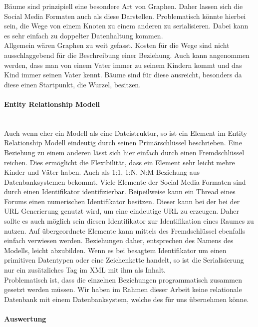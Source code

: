 \documentclass[a4paper]{article}
\begin{document}
	Bäume sind prinzipiell eine besondere Art von Graphen. Daher lassen sich
	die Social Media Formaten auch als diese Darstellen. Problematisch
	könnte hierbei sein, die Wege von einem Knoten zu einem anderen zu
	serialisieren. Dabei kann es sehr einfach zu doppelter Datenhaltung kommen. \\
	
	Allgemein wären Graphen zu weit gefasst. Kosten für die Wege sind nicht
	ausschlaggebend für die Beschreibung einer Beziehung. Auch kann angenommen
	werden, dass man von einem Vater immer zu seinem Kindern kommt und das Kind
	immer seinen Vater kennt. Bäume sind für diese ausreicht, besonders da diese
	einen Startpunkt, die Wurzel, besitzen.
	
	\paragraph{Entity Relationship Modell}\mbox{} \\
	
	Auch wenn eher ein Modell als eine Dateistruktur, so ist ein Element im
	Entity Relationship Modell eindeutig durch seinen Primärschlüssel beschrieben.
	Eine Beziehung zu einem anderen lässt sich hier einfach durch einen
	Fremdschlüssel reichen. Dies ermöglicht die Flexibilität, dass ein Element
	sehr leicht mehre Kinder und Väter haben. Auch als 1:1, 1:N. N:M Beziehung
	aus Datenbanksystemen bekommt. Viele Elemente der Social Media Formaten sind
	durch einen Identifikator identifizierbar. Beipeilweise kann ein Thread eines
	Forums einen numerischen Identifikator besitzen. Dieser kann bei der bei der
	URL Generierung	genutzt wird, um eine eindeutige URL zu erzeugen. Daher sollte
	es auch möglich sein diesen Identifikator zur Identifikation eines Raumes zu
	nutzen. Auf übergeordnete Elemente kann mittels des Fremdschlüssel ebenfalls
	einfach verwiesen werden. Beziehungen daher, entsprechen des Namens des
	Modells, leicht abzubilden.	Wenn es bei besagtem Identifikator um einen
	primitiven Datentypen oder eine Zeichenkette handelt, so ist die
	Serialisierung nur ein zusätzliches Tag im XML mit ihm als Inhalt. \\
	
	Problematisch ist, dass die einzelnen Beziehungen programmatisch zusammen
	gesetzt werden müssen. Wir haben im Rahmen dieser Arbeit keine relationale
	Datenbank mit einem Datenbanksystem, welche des für uns übernehmen könne.
	
	\paragraph{Auswertung}\mbox{} \\
	
\end{document}
